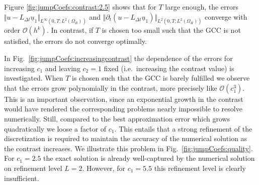 \documentclass[sn-mathphys-num]{sn-jnl}
\numberwithin{equation}{section}
\newcommand{\ul}{\underline{u}}
\begin{document}
\noindent Figure \ref{fig:jumpCoefs:contrast:2.5} shows that for $T$ large enough, the errors $\Vert u-L_{\Delta t} \ul_1 \Vert_{L^\infty(0,T;L^2(\Omega_R))}$ and $\Vert \partial_t (u-L_{\Delta t} \ul_1) \Vert_{L^2(0,T;L^2(\Omega_R))}$ converge with order $\mathcal{O}(h^k)$. In contrast, if $T$ is chosen too small such that the GCC is not satisfied, the errors do not converge optimally. 

In Fig.~\ref{fig:jumpCoefs:increasingcontrast} the dependence of the errors for increasing $c_1$ and 
leaving $c_2 = 1$ fixed (i.e.\ increasing the contrast value) is investigated. When $T$ is chosen such that the GCC is barely fulfilled we observe that the errors grow polynomially in the contrast, more precisely like $\mathcal{O}(c_1^3)$.
This is an important observation, since an exponential growth in the contrast would have rendered the corresponding problems nearly impossible to resolve numerically.
Still, compared to the best approximation error which grows quadratically we 
loose a factor of $c_1$. This entails that a strong refinement of the discretization is required to maintain the accuracy of the numerical solution as the contrast increases. We illustrate this problem in Fig.~\ref{fig:jumpCoefs:quality}. For $c_1 = 2.5$ the exact solution is already well-captured by the numerical solution on refinement level $L=2$. However, for $c_1 = 5.5$ this refinement level is clearly insufficient. 
 
\end{document}
